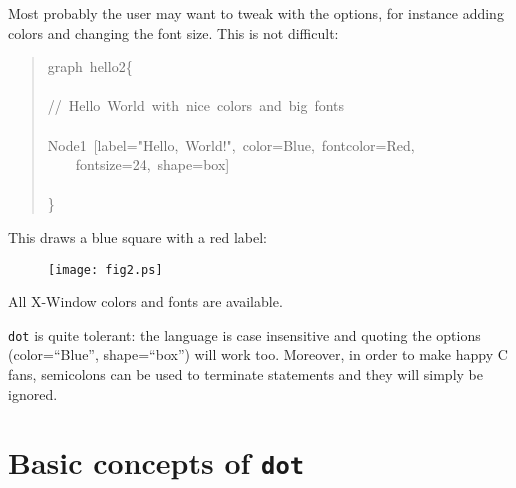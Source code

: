 \documentclass[10pt,english]{article}
\begin{document}
Most probably the user may want to tweak with the options,
for instance adding colors and changing the font size. 
This is not difficult:
\begin{quote}
\begin{ttfamily}\begin{flushleft}
\mbox{graph~hello2{\{}}\\
\mbox{}\\
\mbox{//~Hello~World~with~nice~colors~and~big~fonts}\\
\mbox{}\\
\mbox{Node1~[label="Hello,~World!",~color=Blue,~fontcolor=Red,}\\
\mbox{~~~~fontsize=24,~shape=box]}\\
\mbox{~}\\
\mbox{{\}}}
\end{flushleft}\end{ttfamily}
\end{quote}

This draws a blue square with a red label:
\begin{figure}

\texttt{[image: fig2.ps]}
\end{figure}

All X-Window colors and fonts are available.

\texttt{dot} is quite tolerant: the language is case insensitive and 
quoting the options (color=``Blue'', shape=``box'') will work too. 
Moreover, in order to make happy C fans, semicolons can be used 
to terminate statements and they will simply be ignored.



\hypertarget{basic-concepts-of-dot}{}
\section*{Basic concepts of \texttt{dot}}
\end{document}
